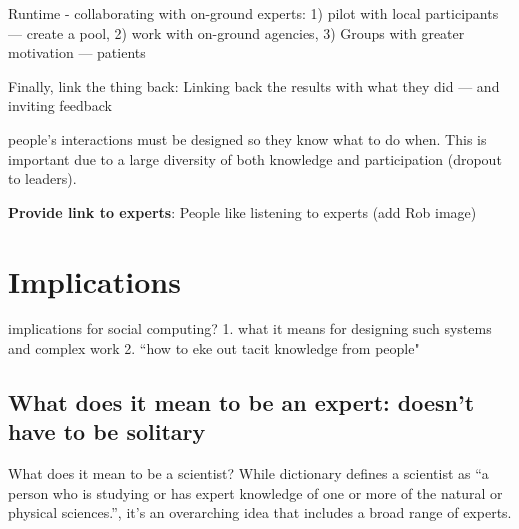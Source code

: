 Runtime - collaborating with on-ground experts: 1) pilot with local participants  — create a pool, 2) work with on-ground agencies, 3) Groups with greater motivation — patients


Finally, link the thing back: Linking back the results with what they did — and inviting feedback 

people’s interactions must be designed so they know what to do when. This is important due to a large diversity of both knowledge and participation  (dropout to leaders). 

\textbf{Provide link to experts}: People like listening to experts (add Rob image)







\section{Implications}

implications for social computing?
1. what it means for designing such systems and complex work
2. “how to eke out tacit knowledge from people"

\subsection{What does it mean to be an expert: doesn’t have to be solitary} 
What does it mean to be a scientist? While dictionary defines a scientist as “a person who is studying or has expert knowledge of one or more of the natural or physical sciences.”, it’s an overarching idea that includes a broad range of experts. 

